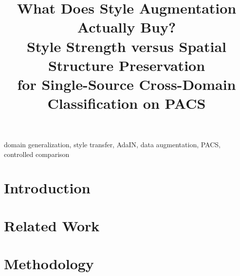 \documentclass[conference]{IEEEtran}
\begin{document}
\title{What Does Style Augmentation Actually Buy?\\
Style Strength versus Spatial Structure Preservation\\
for Single-Source Cross-Domain Classification on PACS}

\author{
\and
{}
\and
{}
\and
{}
\and
{}
}

\maketitle

\begin{abstract}

\end{abstract}

\begin{IEEEkeywords}
domain generalization, style transfer, AdaIN, data augmentation, PACS,
controlled comparison
\end{IEEEkeywords}

\section{Introduction}



\section{Related Work}





\section{Methodology}








\end{document}
